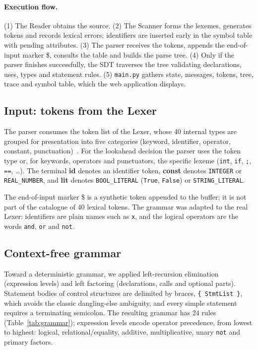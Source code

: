 \documentclass[11pt,a4paper]{article}
\newcommand{\tk}[1]{\texttt{#1}}
\begin{document}
\paragraph{Execution flow.}
(1) The Reader obtains the source. (2) The Scanner forms the lexemes, generates tokens and records lexical errors; identifiers are inserted early in the symbol table with pending attributes. (3) The parser receives the tokens, appends the end-of-input marker \$, consults the table and builds the parse tree. (4) Only if the parser finishes successfully, the SDT traverses the tree validating declarations, uses, types and statement rules. (5) \texttt{main.py} gathers state, messages, tokens, tree, trace and symbol table, which the web application displays.

\subsection{Input: tokens from the Lexer}
The parser consumes the token list of the Lexer, whose 40 internal types are grouped for presentation into five categories (keyword, identifier, operator, constant, punctuation)~\cite{lexer-report}. For the lookahead decision the parser uses the token type or, for keywords, operators and punctuators, the specific lexeme (\tk{int}, \tk{if}, \tk{;}, \tk{==}, \dots). The terminal \textbf{id} denotes an identifier token, \textbf{const} denotes \texttt{INTEGER} or \texttt{REAL\_NUMBER}, and \textbf{lit} denotes \texttt{BOOL\_LITERAL} (\tk{True}, \tk{False}) or \texttt{STRING\_LITERAL}.

The end-of-input marker \$ is a synthetic token appended to the buffer; it is not part of the catalogue of 40 lexical tokens. The grammar was adapted to the real Lexer: identifiers are plain names such as \tk{x}, and the logical operators are the words \tk{and}, \tk{or} and \tk{not}.

\subsection{Context-free grammar}
\label{sec:grammar}
Toward a deterministic grammar, we applied left-recursion elimination (expression levels) and left factoring (declarations, calls and optional parts). Statement bodies of control structures are delimited by braces, \tk{\{ StmtList \}}, which avoids the classic dangling-else ambiguity, and every simple statement requires a terminating semicolon. The resulting grammar has 24 rules (Table~\ref{tab:grammar}); expression levels encode operator precedence, from lowest to highest: logical, relational/equality, additive, multiplicative, unary \tk{not} and primary factors.
\end{document}
